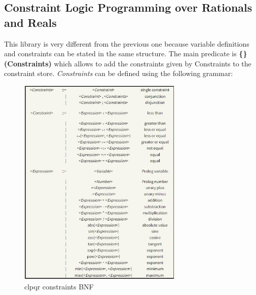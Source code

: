 \subsection{Constraint Logic Programming over Rationals and Reals}\label{subsec:clpqr}
This library is very different from the previous one because variable definitions and constraints can be stated in the same structure. The main predicate is
\textbf{\{\}(Constraints)} which allows to add the constraints given by Constraints to the constraint store.\newline
\textit{Constraints} can be defined using the following grammar:

\begin{figure}[h]
    \centering
    \includegraphics[width=0.70\textwidth]{images/bnf_constraints.jpg}
    \caption{clpqr constraints BNF}
    \label{fig:bnf_constraints}
\end{figure}

